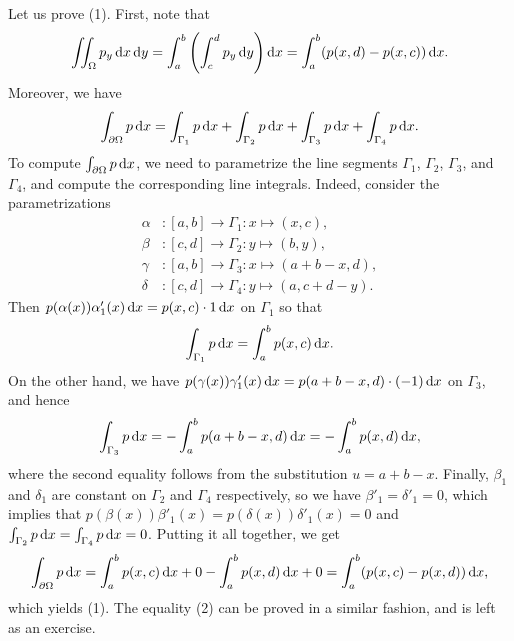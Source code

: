 \documentclass[10pt]{article}
\makeatletter
\theoremstyle{newstyle}
\newenvironment{pf}[1][\proofname]{\par
  \pushQED{\qed}%
  \normalfont \topsep0\p@\relax
  \trivlist
  \item[\hskip\labelsep\scshape
  #1\@addpunct{.}]\ignorespaces
}{%
  \popQED\endtrivlist\@endpefalse
}
\makeatother
\begin{document}
\begin{pf}
\begin{center}
\end{center}

Let us prove (1). First, note that 
\[ \iint_\Omega p_y\,{\rm d}x\,{\rm d}y = \int_a^b \left( \int_c^d p_y\,{\rm d}y \right){\rm d}x 
= \int_a^b (p(x, d) - p(x, c))\,{\rm d}x. \]
Moreover, we have 
\[ \int_{\partial\Omega} p\,{\rm d}x = \int_{\Gamma_1} p\,{\rm d}x + \int_{\Gamma_2} p\,{\rm d}x
+ \int_{\Gamma_3} p\,{\rm d}x + \int_{\Gamma_4} p\,{\rm d}x. \]
To compute $\int_{\partial\Omega} p\,{\rm d}x$, we need to parametrize the line segments 
$\Gamma_1$, $\Gamma_2$, $\Gamma_3$, and $\Gamma_4$, and compute the corresponding line integrals. 
Indeed, consider the parametrizations 
\begin{align*}
    \alpha &: [a, b] \to \Gamma_1 : x \mapsto (x, c), \\
    \beta &: [c, d] \to \Gamma_2 : y \mapsto (b, y), \\
    \gamma &: [a, b] \to \Gamma_3 : x \mapsto (a+b-x, d), \\
    \delta &: [c, d] \to \Gamma_4 : y \mapsto (a, c+d-y).
\end{align*}
Then $p(\alpha(x)) \alpha'_1(x)\,{\rm d}x = p(x, c) \cdot 1 \,{\rm d}x$ on $\Gamma_1$ so that 
\[ \int_{\Gamma_1} p\,{\rm d}x = \int_a^b p(x, c)\,{\rm d}x. \] 
On the other hand, we have $p(\gamma(x)) \gamma'_1(x)\,{\rm d}x = p(a+b-x, d) \cdot (-1)\,{\rm d}x$
on $\Gamma_3$, and hence 
\[ \int_{\Gamma_3} p\,{\rm d}x = -\int_a^b p(a+b-x, d)\,{\rm d}x = -\int_a^b p(x, d)\,{\rm d}x, \]
where the second equality follows from the substitution $u = a+b-x$. Finally, 
$\beta_1$ and $\delta_1$ are constant on $\Gamma_2$ and $\Gamma_4$ respectively, so we have 
$\beta'_1 = \delta'_1 = 0$, which implies that $p(\beta(x))\beta'_1(x) = p(\delta(x)) \delta'_1(x) 
= 0$ and $\int_{\Gamma_2} p\,{\rm d}x = \int_{\Gamma_4} p\,{\rm d}x = 0$. Putting it all 
together, we get 
\[ \int_{\partial\Omega} p\,{\rm d}x = \int_a^b p(x, c)\,{\rm d}x + 0 - \int_a^b p(x, d)\,{\rm d}x 
+ 0 = \int_a^b (p(x, c) - p(x, d))\,{\rm d}x, \]
which yields (1). The equality (2) can be proved in a similar fashion, and is left as an exercise.
\end{pf}
\end{document}
